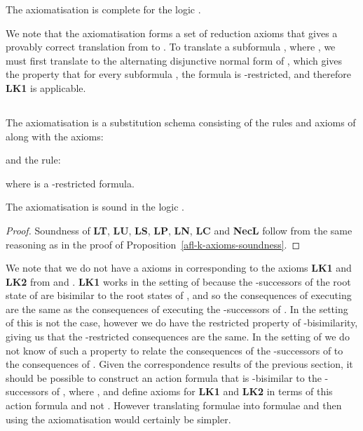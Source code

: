 \documentclass[twoside]{aiml14}
\begin{document}
  \begin{proposition}\label{afl-kff-axioms-completeness}
      The axiomatisation \axiomAflKFF{} is complete for the logic \logicAmlKFF{}.
  \end{proposition}

  We note that the axiomatisation \axiomAflKFF{} forms a set of reduction
  axioms that gives a provably correct translation from \langAfl{} to \lang{}.
  To translate a subformula , where , we
  must first translate  to the alternating disjunctive normal form of
  \cite{hales2012}, which gives the property that for every subformula
  , the formula  is -restricted, and therefore {\bf LK1} is applicable.

  \subsection{\classS{}}

  \begin{definition}\label{afl-s-axioms}
      The axiomatisation \axiomAflS{} is a substitution schema consisting of the
      rules and axioms of \axiomS{} along with the axioms:
      
      and the rule:
      
      where  is a -restricted formula.
  \end{definition}

  \begin{proposition}\label{afl-s-axioms-soundness}
      The axiomatisation \axiomAflS{} is sound in the logic \logicAmlS{}.
  \end{proposition}

  \begin{proof}
      Soundness of {\bf LT}, {\bf LU}, {\bf LS}, {\bf LP}, {\bf LN}, {\bf LC}
      and {\bf NecL} follow from the same reasoning as in the proof of
      Proposition~\ref{afl-k-axioms-soundness}.
  \end{proof}

  We note that we do not have a axioms in \logicAflS{} corresponding to the
  axioms {\bf LK1} and {\bf LK2} from \axiomAflK{} and \axiomAflKFF{}.
  {\bf LK1} works in the setting of \classK{} because the -successors
  of the root state of  are bisimilar to the
  root states of , and so the consequences of executing
   are the same as the consequences of executing the
  -successors of . In the setting of
  \classKFF{} this is not the case, however we do have the restricted property
  of -bisimilarity, giving us that the -restricted
  consequences are the same. In the setting of \classS{} we do not know of such
  a property to relate the consequences of the -successors of
   to the consequences of . Given the correspondence results of the previous section, it
  should be possible to construct an action formula that is -bisimilar to
  the -successors of , where
  , and define axioms for {\bf LK1} and {\bf LK2} in terms of
  this action formula and not . However translating
   formulae into  formulae and then using the
  axiomatisation \axiomAmlS{} would certainly be simpler.
\end{document}
